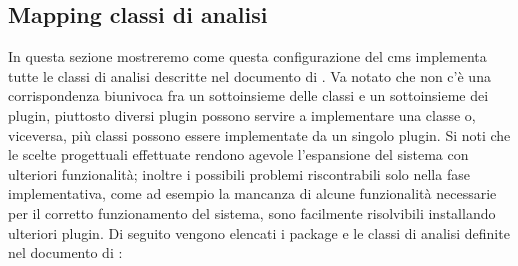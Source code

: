 \subsection{Mapping classi di analisi}
In questa sezione mostreremo come questa configurazione del \gls{cms} implementa tutte le classi di analisi descritte nel documento di . Va notato che non c'è una corrispondenza biunivoca fra un sottoinsieme delle classi e un sottoinsieme dei plugin, piuttosto diversi plugin possono servire a implementare una classe o, viceversa, più classi possono essere implementate da un singolo plugin.
Si noti che le scelte progettuali effettuate rendono agevole l'espansione del sistema con ulteriori funzionalità; inoltre i possibili problemi riscontrabili solo nella fase implementativa, come ad esempio la mancanza di alcune funzionalità necessarie per il corretto funzionamento del sistema, sono facilmente risolvibili installando ulteriori plugin. 
Di seguito vengono elencati i package e le classi di analisi definite nel documento di :
